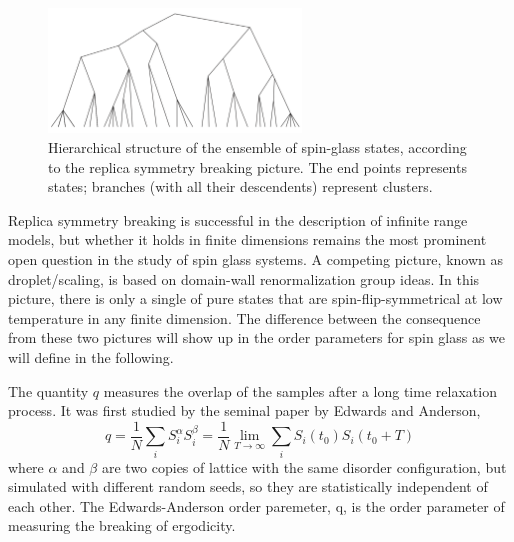 
\begin{figure}[!h]
  \label{fig:TreeRSB}
  \centering
  \includegraphics[width=0.6\textwidth]{img/TreeRSB.png}
  \caption{Hierarchical structure of the ensemble of spin-glass states, according
to the replica symmetry breaking picture. The end points represents states; branches (with all their descendents)
represent clusters.}
\end{figure}


Replica symmetry breaking is successful in the description of infinite range models, but whether it 
holds in finite dimensions remains the most prominent open question in the study of spin glass systems. 
A competing picture, known as droplet/scaling, is based on domain-wall 
renormalization group ideas. In this picture, there is only a single of
pure states that are spin-flip-symmetrical at low temperature in any finite 
dimension. The difference between the consequence from these two pictures 
will show up in the order parameters for spin glass as we will define in the following.


The quantity $q$ measures the overlap of the samples after a long time relaxation process. 
It was first studied by the seminal paper by Edwards and Anderson,
\begin{equation}
  \label{eq:q}
  q=\frac{1}{N}\sum_iS_i^\alpha S_i^\beta=\frac{1}{N}\lim_{T\to \infty}\sum_iS_i(t_0)S_i(t_0+T)
\end{equation}
where $\alpha$ and $\beta$ are two copies of lattice with the same disorder 
configuration, but simulated with different random seeds, so they are
statistically independent of each other. The Edwards-Anderson order paremeter, q, 
is the order parameter of measuring the breaking of ergodicity. 

